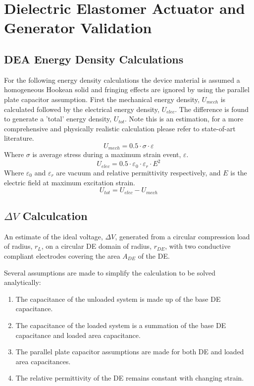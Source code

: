 \chapter{Dielectric Elastomer Actuator and Generator Validation}

\section{DEA Energy Density Calculations}
\label{DEA_Edensity}
For the following energy density calculations the device material is assumed a homogeneous Hookean solid and fringing effects are ignored by using the parallel plate capacitor assumption. First the mechanical energy density, $U_{mech}$ is calculated followed by the electrical energy density, $U_{elec}$. The difference is found to generate a 'total' energy density, $U_{tot}$. Note this is an estimation, for a more comprehensive and physically realistic calculation please refer to state-of-art literature.
\begin{equation}
	U_{mech} = 0.5 \cdot \sigma \cdot \varepsilon
\end{equation}
Where $\sigma$ is average stress during a maximum strain event, $\varepsilon$.
\begin{equation}
	U_{elec} = 0.5 \cdot \varepsilon_0 \cdot \varepsilon_r \cdot E^2
\end{equation}
Where $\varepsilon_0$ and $\varepsilon_r$ are vacuum and relative permittivity respectively, and $E$ is the electric field at maximum excitation strain.
\begin{equation}
	U_{tot} = U_{elec} - U_{mech}
\end{equation}

\section{$\Delta V$ Calculcation}
\label{appendix-F}
An estimate of the ideal voltage, $\Delta V$, generated from a circular compression load of radius, $r_L$, on a circular DE domain of radius, $r_{DE}$, with two conductive compliant electrodes covering the area $A_{DE}$ of the DE.

Several assumptions are made to simplify the calculation to be solved analytically:
\begin{enumerate}
	\item The capacitance of the unloaded system is made up of the base DE capacitance.
	\item The capacitance of the loaded system is a summation of the base DE capacitance and loaded area capacitance.
	\item The parallel plate capacitor assumptions are made for both DE and loaded area capacitances.
	\item The relative permittivity of the DE remains constant with changing strain.
\end{enumerate}

